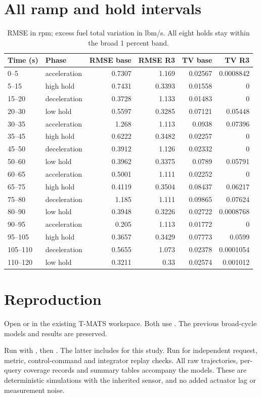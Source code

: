 \documentclass[11pt,a4paper]{article}
\begin{document}
\section{All ramp and hold intervals}
\begin{table}[H]\centering\small\begin{tabular}{llrrrr}\toprule
Time (s) & Phase & RMSE base & RMSE R3 & TV base & TV R3\\\midrule
0--5 & acceleration & 0.7307 & 1.169 & 0.02567 & 0.0008842\\
5--15 & high hold & 0.7431 & 0.3393 & 0.01558 & 0\\
15--20 & deceleration & 0.3728 & 1.133 & 0.01483 & 0\\
20--30 & low hold & 0.5597 & 0.3285 & 0.07121 & 0.05448\\
30--35 & acceleration & 1.268 & 1.113 & 0.0938 & 0.07396\\
35--45 & high hold & 0.6222 & 0.3482 & 0.02257 & 0\\
45--50 & deceleration & 0.3912 & 1.126 & 0.02332 & 0\\
50--60 & low hold & 0.3962 & 0.3375 & 0.0789 & 0.05791\\
60--65 & acceleration & 0.5001 & 1.111 & 0.02252 & 0\\
65--75 & high hold & 0.4119 & 0.3504 & 0.08437 & 0.06217\\
75--80 & deceleration & 1.185 & 1.111 & 0.09865 & 0.07624\\
80--90 & low hold & 0.3948 & 0.3226 & 0.02722 & 0.0008768\\
90--95 & acceleration & 0.205 & 1.113 & 0.01772 & 0\\
95--105 & high hold & 0.3657 & 0.3429 & 0.07773 & 0.0599\\
105--110 & deceleration & 0.5655 & 1.073 & 0.02378 & 0.0001054\\
110--120 & low hold & 0.3211 & 0.33 & 0.02574 & 0.001012\\
\bottomrule\end{tabular}\caption{RMSE in rpm; excess fuel total variation in lbm/s. All eight holds stay within the broad 1 percent band.}\end{table}
\section{Reproduction}
Open  or  in the existing T-MATS workspace. Both use . The previous broad-cycle models and results are preserved.

Run  with , then . The latter includes  for this study. Run  for independent request, metric, control-command and integrator replay checks. All raw trajectories, per-query coverage records and summary tables accompany the models. These are deterministic simulations with the inherited sensor, and no added actuator lag or measurement noise.
\end{document}
